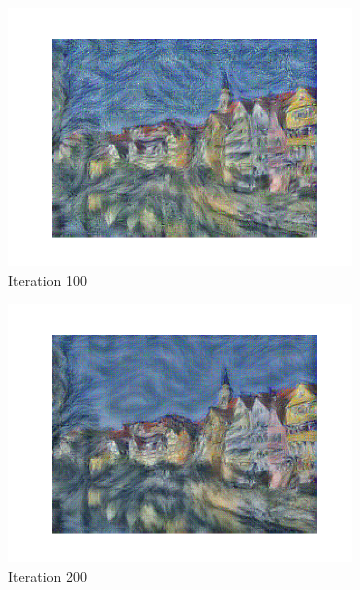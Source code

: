 \documentclass[12pt]{article}
\begin{document}
\begin{figure}[htbp]
\begin{subfigure}[t]{0.48\textwidth}
        \centering
        \includegraphics[trim={3in 0in 3in 0in},scale=0.5]{./Homework2/output/hw2p2_fig11.png}
        \caption{Iteration 100}
    \label{hw2p2m}
    \end{subfigure}
    \begin{subfigure}[t]{0.48\textwidth}
        \centering
        \includegraphics[trim={3in 0in 3in 0in},scale=0.5]{./Homework2/output/hw2p2_fig12.png}
        \caption{Iteration 200}
    \label{hw2p2n}
    \end{subfigure}
    \begin{subfigure}[t]{0.48\textwidth}
        \centering

\end{subfigure}
\end{figure}
\end{document}
